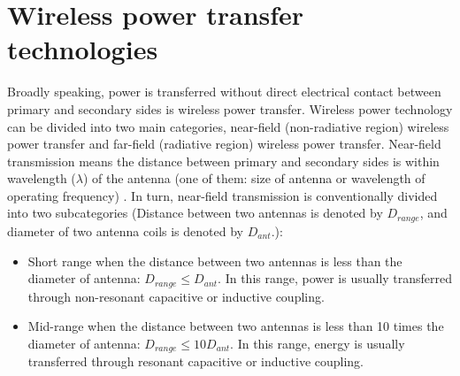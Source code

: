 \section{Wireless power transfer technologies}

Broadly speaking, power is transferred without direct electrical contact between primary and secondary sides is wireless power transfer. 
Wireless power technology can be divided into two main categories, near-field (non-radiative region) wireless power transfer and far-field (radiative region) wireless power transfer. 
Near-field transmission means the distance between primary and secondary sides is within wavelength ($\lambda$) of the antenna (one of them: size of antenna or wavelength of operating frequency) \cite{}. In turn, near-field transmission is conventionally divided into two subcategories \cite{Wikipedia2021} (Distance between two antennas is denoted by $D_{range}$, and diameter of two antenna coils is denoted by $D_{ant}$.):
\begin{itemize}
    \item  Short range when the distance between two antennas is less than the diameter of antenna: $D_{range} \leq D_{ant}$. 
In this range, power is usually transferred through non-resonant capacitive or inductive coupling.
    \item Mid-range when the distance between two antennas is less than 10 times the diameter of antenna:  $D_{range} \leq 10 D_{ant}$. 
    In this range, energy is usually transferred through resonant capacitive or inductive coupling.
\end{itemize} 

\begin{table}[!t]
    \centering
    \caption{The different wireless power transmission technologies.}
    \label{table:differentWPT}
\end{table}


